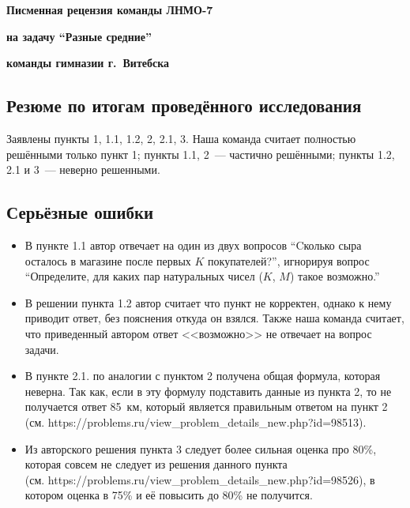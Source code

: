 \documentclass[12pt,twoside]{article}
\begin{document}
\centerline{\bf\large Писменная рецензия команды ЛНМО-7}	
\centerline{\bf\large на задачу  ``Разные средние''}
\centerline{\bf\large команды гимназии  г.~Витебска}
\vspace{6pt}
\subsection*{Резюме по итогам проведённого исследования}
\noindent Заявлены пункты 1, 1.1, 1.2, 2, 2.1, 3. Наша команда считает полностью решёнными только пункт 1; пункты 1.1, 2~--- частично решёнными; пункты 1.2, 2.1 и 3~--- неверно решенными.

\subsection*{Серьёзные ошибки}
\begin{itemize}
\item В пункте 1.1 автор отвечает на один из двух вопросов ``Cколько сыра осталось в магазине после первых $K$ покупателей?'', игнорируя вопрос ``Определите, для каких пар натуральных чисел ($K$, $M$) такое возможно.''
\item В решении пункта 1.2 автор считает что пункт не корректен, однако к нему приводит ответ, без пояснения откуда он взялся. Также наша команда считает, что приведенный автором ответ <<возможно>> не отвечает на вопрос задачи.
\item В пункте 2.1. по аналогии с пунктом 2 получена общая формула, которая неверна. Так как, если в эту формулу подставить данные из пункта 2, то не получается ответ 85~км, который является правильным ответом на пункт 2\\
(см. https://problems.ru/view\_problem\_details\_new.php?id=98513).
\item Из авторского решения пункта 3 следует более сильная оценка про 80\%, которая совсем не следует из решения данного пункта \\
(см. https://problems.ru/view\_problem\_details\_new.php?id=98526), в котором оценка в 75\% и её повысить до 80\% не получится.
\end{itemize}
\end{document}
